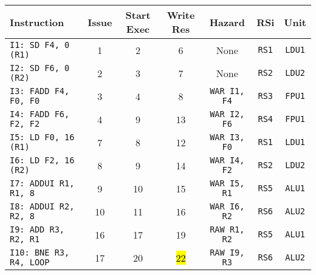 \begin{enumerate}
    \begin{table}[!htp]
        \centering
        \begin{adjustbox}{width={\textwidth},totalheight={\textheight},keepaspectratio}
        \begin{tabular}{@{} l c c c c c c @{}}
            \toprule
            \textbf{Instruction} & \textbf{Issue} & \textbf{Start Exec} & \textbf{Write Res} & \textbf{Hazard} & \textbf{RSi} & \textbf{Unit} \\
            \midrule
            \texttt{I1: SD F4, 0 (R1)}      & 1 & 2 & 6 & None  & \texttt{RS1}   & \texttt{LDU1}  \\ [.5em]
            \texttt{I2: SD F6, 0 (R2)}      & 2 & 3 & 7 & None  & \texttt{RS2}   & \texttt{LDU2}  \\ [.5em]
            \texttt{I3: FADD F4, F0, F0}    & 3 & 4 & 8 & \texttt{WAR I1, F4}  & \texttt{RS3} & \texttt{FPU1} \\ [.5em]
            \texttt{I4: FADD F6, F2, F2}    & 4 & 9 & 13 & \texttt{WAR I2, F6} & \texttt{RS4} & \texttt{FPU1} \\ [.5em]
            \texttt{I5: LD F0, 16 (R1)}     & 7 & 8 & 12 & \texttt{WAR I3, F0} & \texttt{RS1} & \texttt{LDU1} \\ [.5em]
            \texttt{I6: LD F2, 16 (R2)}     & 8 & 9 & 14 & \texttt{WAR I4, F2} & \texttt{RS2} & \texttt{LDU2} \\ [.5em]
            \texttt{I7: ADDUI R1, R1, 8}    & 9 & 10 & 15 & \texttt{WAR I5, R1} & \texttt{RS5} & \texttt{ALU1} \\ [.5em]
            \texttt{I8: ADDUI R2, R2, 8}    & 10 & 11 & 16 & \texttt{WAR I6, R2} & \texttt{RS6} & \texttt{ALU2} \\ [.5em]
            \texttt{I9: ADD R3, R2, R1}     & 16 & 17 & 19 & \texttt{RAW R1, R2} & \texttt{RS5} & \texttt{ALU1} \\ [.5em]
            \texttt{I10: BNE R3, R4, LOOP}   & 17 & 20 & \hl{22} & \texttt{RAW I9, R3} & \texttt{RS6} & \texttt{ALU2} \\
            \bottomrule
        \end{tabular}
        \end{adjustbox}
    \end{table}
    

\end{enumerate}
